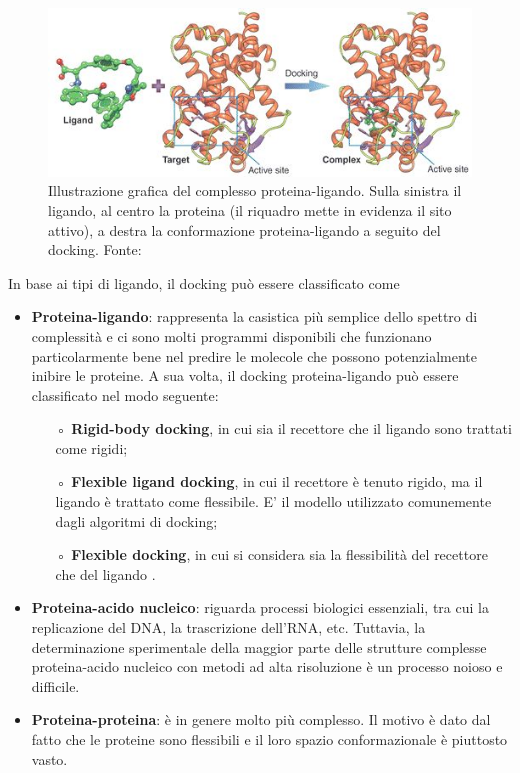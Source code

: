 \begin{figure}[H]
    \centering
    \includegraphics[scale=0.8]{images/docking.jpg}
    \caption[Illustrazione grafica del complesso proteina-ligando.]{Illustrazione grafica del complesso proteina-ligando. Sulla sinistra il ligando, al centro la proteina (il riquadro mette in evidenza il sito attivo), a destra la conformazione proteina-ligando a seguito del docking. Fonte: \cite{liao_molecular_2013}}
    \label{fig:molecular_docking}
\end{figure}

In base ai tipi di ligando, il docking può essere classificato come
\begin{itemize}
    \item \textbf{Proteina-ligando}: rappresenta la casistica più semplice dello spettro di complessità e ci sono molti programmi disponibili che funzionano particolarmente bene nel predire le molecole che possono potenzialmente inibire le proteine. 
    A sua volta, il docking proteina-ligando può essere classificato nel modo seguente: 
    \begin{itemize}
        \item[◦] \textbf{Rigid-body docking}, in cui sia il recettore che il ligando sono trattati come rigidi; 
        \item[◦] \textbf{Flexible ligand docking}, in cui il recettore è tenuto rigido, ma il ligando è trattato come flessibile. E' il modello  utilizzato comunemente dagli algoritmi di docking;
        \item[◦] \textbf{Flexible docking}, in cui si considera sia la flessibilità del recettore che del ligando \cite{roy_chapter_2015}.
    \end{itemize}
    \item \textbf{Proteina-acido nucleico}: riguarda processi biologici essenziali, tra cui la replicazione del DNA, la trascrizione dell'RNA, etc. Tuttavia, la determinazione sperimentale della maggior parte delle strutture complesse proteina-acido nucleico con metodi ad alta risoluzione è un processo noioso e difficile.
    \item \textbf{Proteina-proteina}: è in genere molto più complesso. Il motivo è dato dal fatto che le proteine sono flessibili e il loro spazio conformazionale è piuttosto vasto.
\end{itemize}

